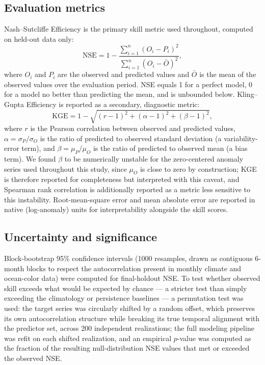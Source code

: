 \documentclass[preprint,12pt]{elsarticle}
\begin{document}
\subsection{Evaluation metrics}
Nash--Sutcliffe Efficiency \citep[NSE;][]{nash1970river} is the primary skill metric used throughout, computed on held-out data only:
\begin{equation}
\mathrm{NSE} = 1 - \frac{\sum_{i=1}^{n}(O_i - P_i)^2}{\sum_{i=1}^{n}(O_i - \bar{O})^2},
\label{eq:nse}
\end{equation}
where $O_i$ and $P_i$ are the observed and predicted values and $\bar{O}$ is the mean of the observed values over the evaluation period. NSE equals 1 for a perfect model, 0 for a model no better than predicting the mean, and is unbounded below. Kling--Gupta Efficiency \citep[KGE;][]{gupta2009decomposition} is reported as a secondary, diagnostic metric:
\begin{equation}
\mathrm{KGE} = 1 - \sqrt{(r-1)^2 + (\alpha-1)^2 + (\beta-1)^2},
\label{eq:kge}
\end{equation}
where $r$ is the Pearson correlation between observed and predicted values, $\alpha = \sigma_P/\sigma_O$ is the ratio of predicted to observed standard deviation (a variability-error term), and $\beta = \mu_P/\mu_O$ is the ratio of predicted to observed mean (a bias term). We found $\beta$ to be numerically unstable for the zero-centered anomaly series used throughout this study, since $\mu_O$ is close to zero by construction; KGE is therefore reported for completeness but interpreted with this caveat, and Spearman rank correlation is additionally reported as a metric less sensitive to this instability. Root-mean-square error and mean absolute error are reported in native (log-anomaly) units for interpretability alongside the skill scores.

\subsection{Uncertainty and significance}
Block-bootstrap 95\% confidence intervals (1000 resamples, drawn as contiguous 6-month blocks to respect the autocorrelation present in monthly climate and ocean-color data) were computed for final-holdout NSE. To test whether observed skill exceeds what would be expected by chance --- a stricter test than simply exceeding the climatology or persistence baselines --- a permutation test was used: the target series was circularly shifted by a random offset, which preserves its own autocorrelation structure while breaking its true temporal alignment with the predictor set, across 200 independent realizations; the full modeling pipeline was refit on each shifted realization, and an empirical $p$-value was computed as the fraction of the resulting null-distribution NSE values that met or exceeded the observed NSE.
\end{document}
